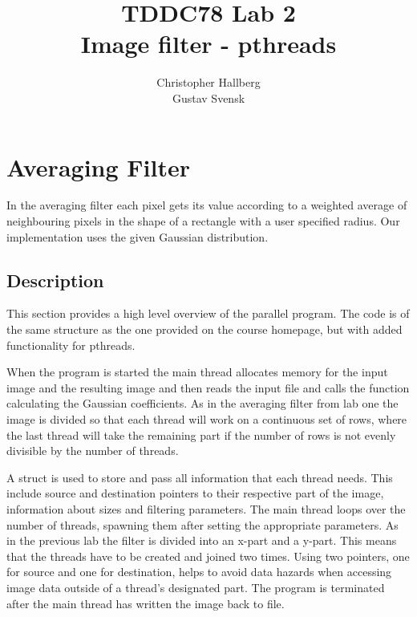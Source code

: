 \documentclass[a4paper, 12pt]{article}
\begin{document}
\title{TDDC78 Lab 2\\
        Image filter - pthreads}
\author{Christopher Hallberg \\
        Gustav Svensk}
\maketitle

\thispagestyle{empty}

\newpage
\setcounter{page}{1}
\tableofcontents
\newpage

\section{Averaging Filter}
In the averaging filter each pixel gets its value according to a weighted average
of neighbouring pixels in the shape of a rectangle with a user specified radius. 
Our implementation uses the given Gaussian distribution.

\subsection{Description}
\label{sec:desc}
This section provides a high level overview of the parallel program. 
The code is of the same structure as the one provided on the course homepage,
but with added functionality for pthreads.

When the program is started the main thread allocates memory for the input image
and the resulting image and then reads the input file and calls the function
calculating the Gaussian coefficients. As in the averaging filter from lab one
the image is divided so that each thread will work on a continuous set of rows,
where the last thread will take the remaining part if the number of rows is not
evenly divisible by the number of threads.

A struct is used to store and pass all information that each thread needs. This
include source and destination pointers to their respective part of the image,
information about sizes and filtering parameters. The main thread loops over
the number of threads, spawning them after setting the appropriate parameters.
As in the previous lab the filter is divided into an x-part and a y-part. This
means that the threads have to be created and joined two times. Using two
pointers, one for source and one for destination, helps to avoid data hazards
when accessing image data outside of a thread's designated part. The program is
terminated after the main thread has written the image back to file.
 
\end{document}
